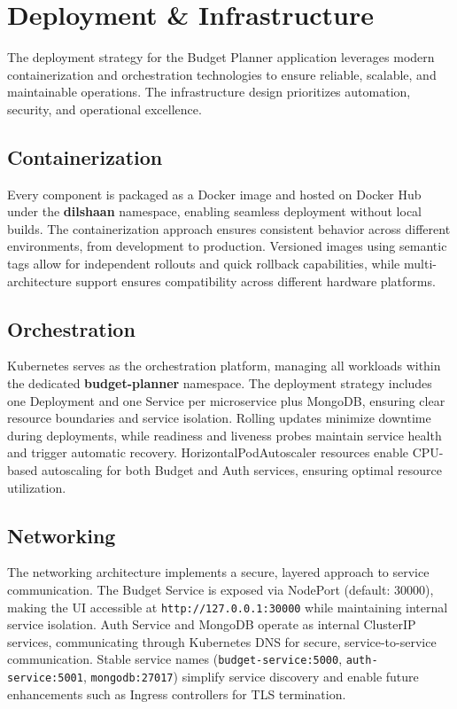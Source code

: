\documentclass[conference]{IEEEtran}
\begin{document}
\section{\textbf{Deployment \& Infrastructure}}
The deployment strategy for the Budget Planner application leverages modern containerization and orchestration technologies to ensure reliable, scalable, and maintainable operations. The infrastructure design prioritizes automation, security, and operational excellence.

\subsection{Containerization}
Every component is packaged as a Docker image and hosted on Docker Hub under the \textbf{dilshaan} namespace, enabling seamless deployment without local builds. The containerization approach ensures consistent behavior across different environments, from development to production. Versioned images using semantic tags allow for independent rollouts and quick rollback capabilities, while multi-architecture support ensures compatibility across different hardware platforms.

\subsection{Orchestration}
Kubernetes serves as the orchestration platform, managing all workloads within the dedicated \textbf{budget-planner} namespace. The deployment strategy includes one Deployment and one Service per microservice plus MongoDB, ensuring clear resource boundaries and service isolation. Rolling updates minimize downtime during deployments, while readiness and liveness probes maintain service health and trigger automatic recovery. HorizontalPodAutoscaler resources enable CPU-based autoscaling for both Budget and Auth services, ensuring optimal resource utilization.

\subsection{Networking}
The networking architecture implements a secure, layered approach to service communication. The Budget Service is exposed via NodePort (default: 30000), making the UI accessible at \texttt{http://127.0.0.1:30000} while maintaining internal service isolation. Auth Service and MongoDB operate as internal ClusterIP services, communicating through Kubernetes DNS for secure, service-to-service communication. Stable service names (\texttt{budget-service:5000}, \texttt{auth-service:5001}, \texttt{mongodb:27017}) simplify service discovery and enable future enhancements such as Ingress controllers for TLS termination.
\end{document}
